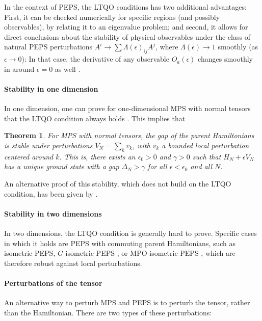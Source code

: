 \documentclass[rmp,aps,reprint,superscriptaddress,nobalancelastpage]{revtex4-1}
\newtheorem{thm}{Theorem}[section]
\begin{document}
    In the context of PEPS, the LTQO conditions has two additional advantages: First, it can be checked numerically for specific regions (and possibly observables), by relating it to an eigenvalue problem; and second, it allows for direct conclusions about the stability of physical observables under the class of natural PEPS perturbations $A^i\to \sum\Lambda(\epsilon)_{ij}A^j$, where $\Lambda(\epsilon)\to1$ smoothly (as $\epsilon\to0$): In that case, the derivative of any observable $O_a(\epsilon)$ changes smoothly in around $\epsilon=0$ as well \cite{cirac:itb}.



    \paragraph{Stability in one dimension} In one dimension, one can prove for one-dimensional MPS with normal tensors that the LTQO condition always holds \cite{cirac:itb}.  This implies that
    \begin{thm}
        For MPS with normal tensors, the gap of the parent Hamiltonians is stable under perturbations $V_N=\sum_k v_k$, with $v_k$ a bounded local perturbation centered around $k$. This is, there exists an $\epsilon_0>0$ and $\gamma>0$ such that $H_N+\epsilon V_N$ has a unique ground state with a gap $\Delta_N>\gamma$ for all $\epsilon<\epsilon_0$ and all $N$.
    \end{thm}

    An alternative proof of this stability, which does not build on the LTQO condition, has been given by \textcite{szehr:gap-stability-1D}.

    \paragraph{Stability in two dimensions}

    In two dimensions, the LTQO condition is generally hard to prove.  Specific cases in which it holds are PEPS with commuting parent Hamiltonians, such as isometric PEPS, $G$-isometric PEPS \cite{schuch:peps-sym}, or MPO-isometric PEPS \cite{sahinoglu:mpo-injectivity}, which are therefore robust against local perturbations.

    \paragraph{Perturbations of the tensor}

    An alternative way to perturb MPS and PEPS is to perturb the tensor, rather than the Hamiltonian.  There are two types of these perturbations:
\end{document}
